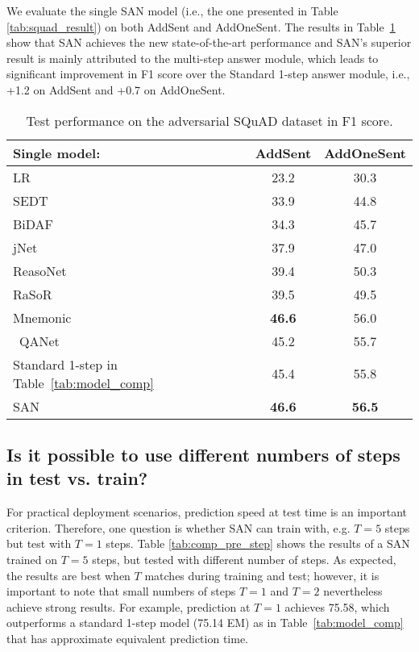 \documentclass[11pt,a4paper]{article}
\begin{document}
We evaluate the single SAN model (i.e., the one presented in Table \ref{tab:squad_result}) on both AddSent and AddOneSent. The results in Table~\ref{tab:adversial_data} show that SAN achieves the new state-of-the-art performance and SAN's superior result is mainly attributed to the multi-step answer module, which leads to significant improvement in F1 score over the Standard 1-step answer module, i.e., +1.2 on AddSent and +0.7 on AddOneSent.



\begin{table}[t]
\centering
\begin{tabular}{@{\hskip1pt}l @{\hskip1pt}||@{\hskip1pt} c @{\hskip1pt}| @{\hskip1pt}c @{\hskip1pt} }
\hline
Single model:&AddSent& AddOneSent \\ \hline
\hline
LR \cite{rajpurkar2016squad} &23.2 &30.3 \\ \hline
SEDT \cite{liu2017structural} &33.9 & 44.8 \\ \hline
BiDAF \cite{seo2016bidirectional}&34.3 & 45.7 \\ \hline
jNet \cite{zhang2017exploring}&37.9 &47.0\\ \hline
ReasoNet\cite{shen2017empirical} & 39.4& 50.3 \\ \hline
RaSoR\cite{lee2016learning} &39.5 &49.5\\ \hline
Mnemonic\cite{hu2017mnemonic} & \textbf{46.6}& 56.0\\\hline \
QANet\cite{yu18qanet} &45.2 &55.7 \\ \hline \hline
Standard 1-step in Table~\ref{tab:model_comp} &45.4& 55.8\\ \hline
SAN &\textbf{46.6}& \textbf{56.5}\\ \hline
\end{tabular}
\caption{\label{tab:adversial_data} Test performance on the adversarial SQuAD dataset in F1 score.}
\end{table}


\subsection{Is it possible to use different numbers of steps in test vs. train?} 
For practical deployment scenarios, prediction speed at test time is an important criterion.
Therefore, one question is whether SAN can train with, e.g. $T=5$ steps but test with $T=1$ steps. 
Table \ref{tab:comp_pre_step} shows the results of a SAN trained on $T=5$ steps, but tested with different number of steps. 
As expected, the results are best when $T$ matches during training and test; however, it is important to note that small numbers of steps $T=1$ and $T=2$ nevertheless achieve strong results.
For example, prediction at $T=1$ achieves 75.58, which outperforms a standard 1-step model (75.14 EM) as in Table~\ref{tab:model_comp} that has approximate equivalent prediction time. 
\end{document}
